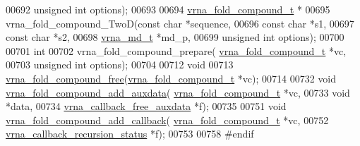 \begin{DoxyCode}
00692                                 \textcolor{keywordtype}{unsigned} \textcolor{keywordtype}{int} options);
00693 
00694 \hyperlink{group__fold__compound_structvrna__fc__s}{vrna\_fold\_compound\_t} *
00695 vrna\_fold\_compound\_TwoD(\textcolor{keyword}{const} \textcolor{keywordtype}{char} *sequence,
00696                         \textcolor{keyword}{const} \textcolor{keywordtype}{char} *s1,
00697                         \textcolor{keyword}{const} \textcolor{keywordtype}{char} *s2,
00698                         \hyperlink{group__model__details_structvrna__md__s}{vrna\_md\_t} *md\_p,
00699                         \textcolor{keywordtype}{unsigned} \textcolor{keywordtype}{int} options);
00700 
00701 \textcolor{keywordtype}{int}
00702 vrna\_fold\_compound\_prepare( \hyperlink{group__fold__compound_structvrna__fc__s}{vrna\_fold\_compound\_t} *vc,
00703                             \textcolor{keywordtype}{unsigned} \textcolor{keywordtype}{int} options);
00704 
00712 \textcolor{keywordtype}{void}
00713 \hyperlink{group__fold__compound_gadded6039d63f5d6509836e20321534ad}{vrna\_fold\_compound\_free}(\hyperlink{group__fold__compound_structvrna__fc__s}{vrna\_fold\_compound\_t} *vc);
00714 
00732 \textcolor{keywordtype}{void} \hyperlink{group__fold__compound_ga6316a9426bea2f742375e8df6febd3f6}{vrna\_fold\_compound\_add\_auxdata}(
      \hyperlink{group__fold__compound_structvrna__fc__s}{vrna\_fold\_compound\_t} *vc,
00733                                     \textcolor{keywordtype}{void} *data,
00734                                     \hyperlink{group__fold__compound_ga3ae51bfd5fc3236652d1de4e3274b49b}{vrna\_callback\_free\_auxdata} *f);
00735 
00751 \textcolor{keywordtype}{void} \hyperlink{group__fold__compound_ga097ed6133055624667cbce8cfdebf82d}{vrna\_fold\_compound\_add\_callback}( 
      \hyperlink{group__fold__compound_structvrna__fc__s}{vrna\_fold\_compound\_t} *vc,
00752                                       \hyperlink{group__fold__compound_ga4a4a0d838de6d18315bafc84f93f5cc0}{vrna\_callback\_recursion\_status} *f);
00753 
00758 \textcolor{preprocessor}{#endif}
\end{DoxyCode}
